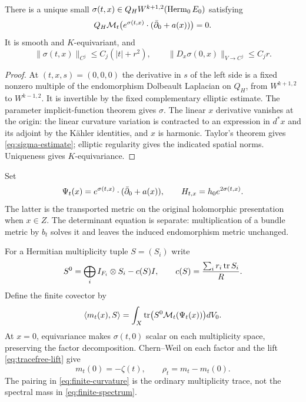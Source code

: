 \begin{lemma}\label{lem:complement}
There is a unique small
$\sigma(t,x)\in Q_HW^{k+1,2}(\operatorname{Herm}_0E_0)$ satisfying
\begin{equation}\label{eq:complement-equation}
 Q_H\mathcal M_t\bigl(e^{\sigma(t,x)}\cdot(\bar\partial_0+a(x))\bigr)=0.
\end{equation}
It is smooth and $K$-equivariant, and
\begin{equation}\label{eq:sigma-estimate}
 \|\sigma(t,x)\|_{C^j}\le C_j(|t|+r^2),\qquad
 \|D_x\sigma(0,x)\|_{V\to C^j}\le C_jr .
\end{equation}
\end{lemma}

\begin{proof}
At $(t,x,s)=(0,0,0)$ the derivative in $s$ of the left side is a
fixed nonzero multiple of the endomorphism Dolbeault Laplacian on
$Q_H$, from $W^{k+1,2}$ to $W^{k-1,2}$.
It is invertible by the fixed complementary elliptic estimate.
The parameter implicit-function theorem gives $\sigma$.
The linear $x$ derivative vanishes at the origin: the linear curvature
variation is contracted to an expression in $d^*x$ and its adjoint
by the K\"ahler identities, and $x$ is harmonic.
Taylor's theorem gives \eqref{eq:sigma-estimate}; elliptic regularity
gives the indicated spatial norms. Uniqueness gives $K$-equivariance.
\end{proof}

Set
\[
 \Psi_t(x)=e^{\sigma(t,x)}\cdot(\bar\partial_0+a(x)),\qquad
 H_{t,x}=h_0e^{2\sigma(t,x)} .
\]
The latter is the transported metric on the original holomorphic
presentation when $x\in Z$. The determinant equation is separate:
multiplication of a bundle metric by $b_t$ solves it and leaves the
induced endomorphism metric unchanged.

For a Hermitian multiplicity tuple $S=(S_i)$ write
\begin{equation}\label{eq:tracefree-lift}
 S^0=\bigoplus_i I_{F_i}\otimes S_i-c(S)I,\qquad
 c(S)=\frac{\sum_i r_i\operatorname{tr} S_i}{R}.
\end{equation}
Define the finite covector by
\begin{equation}\label{eq:finite-curvature}
 \langle m_t(x),S\rangle
   =\int_X\operatorname{tr}\bigl(S^0\mathcal M_t(\Psi_t(x))\bigr)dV_0 .
\end{equation}
At $x=0$, equivariance makes $\sigma(t,0)$ scalar on each multiplicity
space, preserving the factor decomposition. Chern--Weil on each
factor and the lift \eqref{eq:tracefree-lift} give
\begin{equation}\label{eq:central-value}
 m_t(0)=-\zeta(t),\qquad \rho_t=m_t-m_t(0).
\end{equation}
The pairing in \eqref{eq:finite-curvature} is the ordinary
multiplicity trace, not the spectral mass in \eqref{eq:finite-spectrum}.

